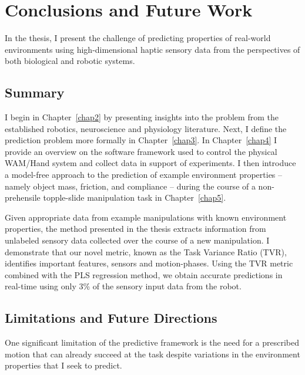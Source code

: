 \chapter{Conclusions and Future Work}
\label{chap6}

In the thesis, I present the challenge of predicting properties of real-world environments using high-dimensional haptic sensory data from the perspectives of both biological and robotic systems.

\section{Summary}

I begin in Chapter~\ref{chap2} by presenting insights into the problem from the established robotics, neuroscience and physiology literature. 
Next, I define the prediction problem more formally in Chapter~\ref{chap3}.
In Chapter~\ref{chap4} I provide an overview on the software framework used to control the physical WAM/Hand system and collect data in support of experiments.
I then introduce a model-free approach to the prediction of example environment properties -- namely object mass, friction, and compliance -- during the course of a non- prehensile topple-slide manipulation task in Chapter~\ref{chap5}.

Given appropriate data from example manipulations with known environment properties, the method  presented in the thesis extracts information from unlabeled sensory data collected over the course of a new manipulation. 
I demonstrate that our novel metric, known as the Task Variance Ratio (TVR), identifies important features, sensors and motion-phases. 
Using the TVR metric combined with the PLS regression method, we obtain accurate predictions in real-time using only 3\% of the sensory input data from the robot. 

\section{Limitations and Future Directions}

One significant limitation of the predictive framework is the need for a prescribed motion that can already succeed at the task despite variations in the environment properties that I seek to predict.


